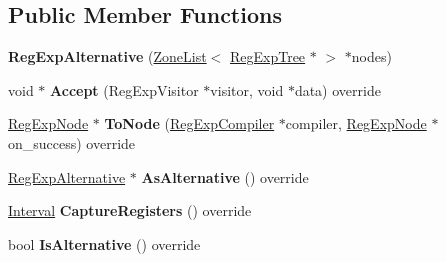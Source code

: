 \subsection*{Public Member Functions}
\begin{DoxyCompactItemize}
\item 
{\bfseries Reg\+Exp\+Alternative} (\hyperlink{classv8_1_1internal_1_1_zone_list}{Zone\+List}$<$ \hyperlink{classv8_1_1internal_1_1_reg_exp_tree}{Reg\+Exp\+Tree} $\ast$ $>$ $\ast$nodes)\hypertarget{classv8_1_1internal_1_1_reg_exp_alternative_a88e4b652e0243acb879cbfa70f5c7688}{}\label{classv8_1_1internal_1_1_reg_exp_alternative_a88e4b652e0243acb879cbfa70f5c7688}

\item 
void $\ast$ {\bfseries Accept} (Reg\+Exp\+Visitor $\ast$visitor, void $\ast$data) override\hypertarget{classv8_1_1internal_1_1_reg_exp_alternative_a2181f51f867cd976ad982238813a2c38}{}\label{classv8_1_1internal_1_1_reg_exp_alternative_a2181f51f867cd976ad982238813a2c38}

\item 
\hyperlink{classv8_1_1internal_1_1_reg_exp_node}{Reg\+Exp\+Node} $\ast$ {\bfseries To\+Node} (\hyperlink{classv8_1_1internal_1_1_reg_exp_compiler}{Reg\+Exp\+Compiler} $\ast$compiler, \hyperlink{classv8_1_1internal_1_1_reg_exp_node}{Reg\+Exp\+Node} $\ast$on\+\_\+success) override\hypertarget{classv8_1_1internal_1_1_reg_exp_alternative_a9ac55d877375e472eae83b627e34d42e}{}\label{classv8_1_1internal_1_1_reg_exp_alternative_a9ac55d877375e472eae83b627e34d42e}

\item 
\hyperlink{classv8_1_1internal_1_1_reg_exp_alternative}{Reg\+Exp\+Alternative} $\ast$ {\bfseries As\+Alternative} () override\hypertarget{classv8_1_1internal_1_1_reg_exp_alternative_a96c326cb934776eccdac7d3f08c3c4de}{}\label{classv8_1_1internal_1_1_reg_exp_alternative_a96c326cb934776eccdac7d3f08c3c4de}

\item 
\hyperlink{classv8_1_1internal_1_1_interval}{Interval} {\bfseries Capture\+Registers} () override\hypertarget{classv8_1_1internal_1_1_reg_exp_alternative_a73140eb9b4a63f3c2cd9cc086277a7bf}{}\label{classv8_1_1internal_1_1_reg_exp_alternative_a73140eb9b4a63f3c2cd9cc086277a7bf}

\item 
bool {\bfseries Is\+Alternative} () override\hypertarget{classv8_1_1internal_1_1_reg_exp_alternative_a05318cd9b60d5e2b92d7623aafcdd6d9}{}\label{classv8_1_1internal_1_1_reg_exp_alternative_a05318cd9b60d5e2b92d7623aafcdd6d9}


\end{DoxyCompactItemize}
